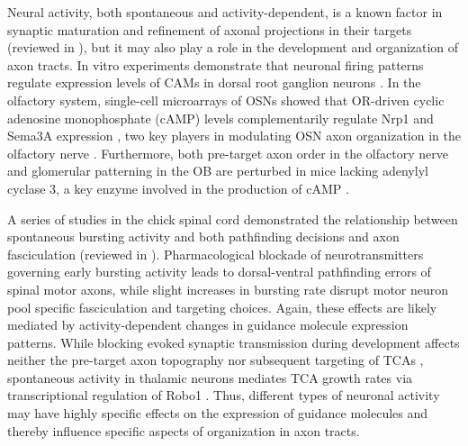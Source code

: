 \label{sec:Intrinsic2}
Neural activity, both spontaneous and activity-dependent, is a known factor in synaptic maturation and refinement of axonal projections in their targets (reviewed in ), but it may also play a role in the development and organization of axon tracts.
In vitro experiments demonstrate that neuronal firing patterns regulate expression levels of CAMs in dorsal root ganglion neurons \cite{itoh1997activity}.
In the olfactory system, single-cell microarrays of OSNs showed that OR-driven cyclic adenosine monophosphate (cAMP) levels complementarily regulate Nrp1 and Sema3A expression \cite{imai2006odorant}, two key players in modulating OSN axon organization in the olfactory nerve \cite{imai2009pre}.
Furthermore, both pre-target axon order in the olfactory nerve and glomerular patterning in the OB are perturbed in mice lacking adenylyl cyclase 3, a key enzyme involved in the production of cAMP \cite{miller2010axon}.

A series of studies in the chick spinal cord demonstrated the relationship between spontaneous bursting activity and both pathfinding decisions and axon fasciculation (reviewed in ).
Pharmacological blockade of neurotransmitters governing early bursting activity leads to dorsal-ventral pathfinding errors of spinal motor axons, while slight increases in bursting rate disrupt motor neuron pool specific fasciculation and targeting choices.
Again, these effects are likely mediated by activity-dependent changes in guidance molecule expression patterns.
While blocking evoked synaptic transmission during development affects neither the pre-target axon topography nor subsequent targeting of TCAs \cite{molnar2002normal}, spontaneous activity in thalamic neurons mediates TCA growth rates via transcriptional regulation of Robo1 \cite{mire2012spontaneous}.
Thus, different types of neuronal activity may have highly specific effects on the expression of guidance molecules and thereby influence specific aspects of organization in axon tracts.